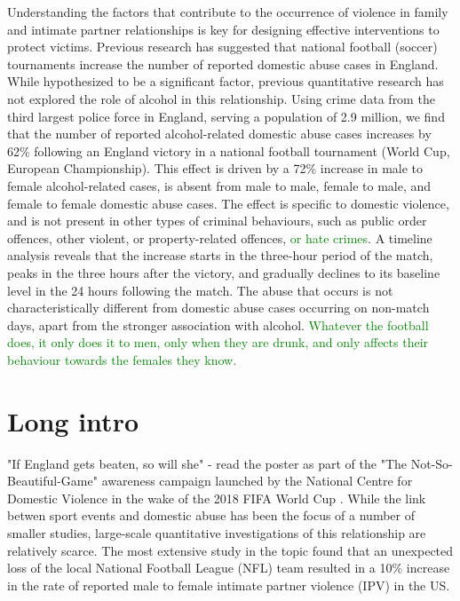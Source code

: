 \documentclass[12pt, letterpaper]{article}
\newcommand{\NS}[1] {{\textcolor{green}{#1}}}
\begin{document}
Understanding the factors that contribute to the occurrence of violence in family and intimate partner relationships is key for designing effective interventions to protect victims. Previous research has suggested that national football (soccer) tournaments increase the number of reported domestic abuse cases in England\autocite{Kirby2014, Brimicombe2012}. While hypothesized to be a significant factor, previous quantitative research has not explored the role of alcohol in this relationship. Using crime data from the third largest police force in England, serving a population of 2.9 million\autocite{populationfigure}, we find that the number of reported alcohol-related domestic abuse cases increases by 62\% following an England victory in a national football tournament (World Cup, European Championship). This effect is driven by a 72\% increase in male to female alcohol-related cases, is absent from male to male, female to male, and female to female domestic abuse cases. The effect is specific to domestic violence, and is not present in other types of criminal behaviours, such as public order offences, other violent, or property-related offences, \NS{or hate crimes}. A timeline analysis reveals that the increase starts in the three-hour period of the match, peaks in the three hours after the victory, and gradually declines to its baseline level in the 24 hours following the match. The abuse that occurs is not characteristically different from domestic abuse cases occurring on non-match days, apart from the stronger association with alcohol. \NS{Whatever the football does, it only does it to men, only when they are drunk, and only affects their behaviour towards the females they know.}


\section{Long intro}

"If England gets beaten, so will she" - read the poster as part of the "The Not-So-Beautiful-Game" awareness campaign launched by the National Centre for Domestic Violence in the wake of the 2018 FIFA World Cup \autocite{NCDV}. While the link betwen sport events and domestic abuse has been the focus of a number of smaller studies\autocite{Williams2014}, large-scale quantitative investigations of this relationship are relatively scarce. The most extensive study in the topic found that an unexpected loss of the local National Football League (NFL) team resulted in a 10\% increase in the rate of reported male to female intimate partner violence (IPV) in the US\autocite{Card2011}. 
\end{document}
